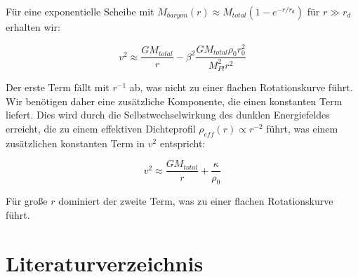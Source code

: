 \documentclass[a4paper,12pt]{article}
\begin{document}
	Für eine exponentielle Scheibe mit $M_{baryon}(r) \approx M_{total}(1 - e^{-r/r_d})$ für $r \gg r_d$ erhalten wir:
	
	\begin{equation}
		v^2 \approx \frac{GM_{total}}{r} - \beta^2\frac{GM_{total}\rho_0 r_0^2}{M_{Pl}^2 r^2}
	\end{equation}
	
	Der erste Term fällt mit $r^{-1}$ ab, was nicht zu einer flachen Rotationskurve führt. Wir benötigen daher eine zusätzliche Komponente, die einen konstanten Term liefert. Dies wird durch die Selbstwechselwirkung des dunklen Energiefeldes erreicht, die zu einem effektiven Dichteprofil $\rho_{eff}(r) \propto r^{-2}$ führt, was einem zusätzlichen konstanten Term in $v^2$ entspricht:
	
	\begin{equation}
		v^2 \approx \frac{GM_{total}}{r} + \frac{\kappa}{\rho_0}
	\end{equation}
	
	Für große $r$ dominiert der zweite Term, was zu einer flachen Rotationskurve führt.
	
	\section{Literaturverzeichnis}
	
\end{document}
